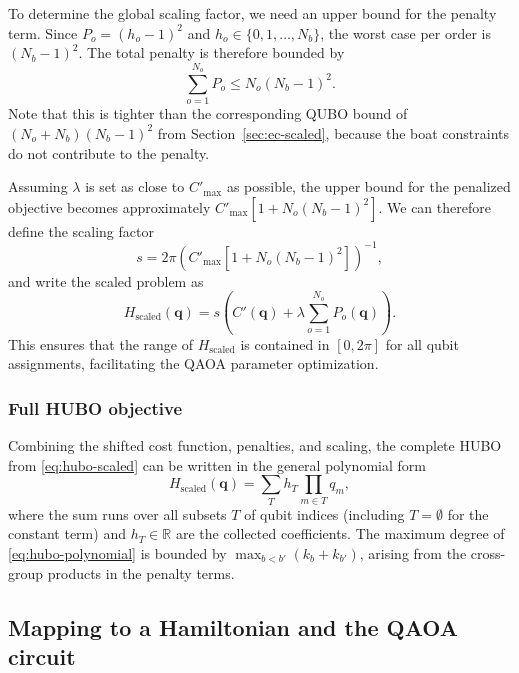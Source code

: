 \documentclass{article}
\begin{document}
To determine the global scaling factor, we need an upper bound for the penalty term. Since $P_o = (h_o - 1)^2$ and $h_o \in \{0, 1, \ldots, N_b\}$, the worst case per order is $(N_b - 1)^2$. The total penalty is therefore bounded by
\begin{equation}
    \sum_{o=1}^{N_o} P_o \leq N_o (N_b - 1)^2.
    \label{eq:hubo-penalty-bound}
\end{equation}
Note that this is tighter than the corresponding QUBO bound of $(N_o + N_b)(N_b - 1)^2$ from Section~\ref{sec:ec-scaled}, because the boat constraints do not contribute to the penalty.

Assuming $\lambda$ is set as close to $C'_{\max}$ as possible, the upper bound for the penalized objective becomes approximately $C'_{\max}\left[1 + N_o(N_b-1)^2\right]$.
We can therefore define the scaling factor
\begin{equation}
    s = 2\pi \left( C'_{\max} \left[1 + N_o (N_b - 1)^2\right] \right)^{-1},
    \label{eq:hubo-scaling-factor}
\end{equation}
and write the scaled problem as
\begin{equation}
    H_{\text{scaled}}(\mathbf{q}) = s \left( C'(\mathbf{q}) + \lambda \sum_{o=1}^{N_o} P_o(\mathbf{q}) \right).
    \label{eq:hubo-scaled}
\end{equation}
This ensures that the range of $H_{\text{scaled}}$ is contained in $[0, 2\pi]$ for all qubit assignments, facilitating the QAOA parameter optimization.


\subsubsection{Full HUBO objective}
Combining the shifted cost function, penalties, and scaling, the complete HUBO from \eqref{eq:hubo-scaled} can be written in the general polynomial form
\begin{equation}
    H_{\text{scaled}}(\mathbf{q}) = \sum_{T} h_T \prod_{m \in T} q_m,
    \label{eq:hubo-polynomial}
\end{equation}
where the sum runs over all subsets $T$ of qubit indices (including $T = \emptyset$ for the constant term) and $h_T \in \mathbb{R}$ are the collected coefficients.
The maximum degree of \eqref{eq:hubo-polynomial} is bounded by $\max_{b < b'} (k_b + k_{b'})$, arising from the cross-group products in the penalty terms.


\subsection{Mapping to a Hamiltonian and the QAOA circuit}
\label{sec:hubo-hamiltonian}
\end{document}
